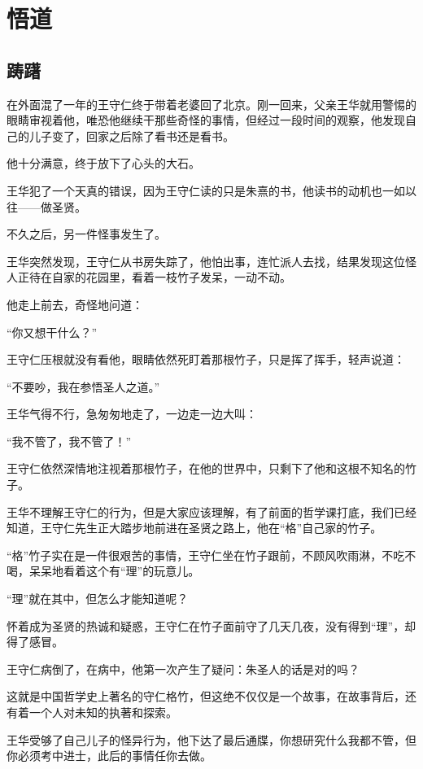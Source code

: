 \section{悟道}
\ifnum{}
	\begin{multicols}{\theparacolNo}
\fi
\subsection{踌躇}
在外面混了一年的王守仁终于带着老婆回了北京。刚一回来，父亲王华就用警惕的眼睛审视着他，唯恐他继续干那些奇怪的事情，但经过一段时间的观察，他发现自己的儿子变了，回家之后除了看书还是看书。

他十分满意，终于放下了心头的大石。

王华犯了一个天真的错误，因为王守仁读的只是朱熹的书，他读书的动机也一如以往——做圣贤。

不久之后，另一件怪事发生了。

王华突然发现，王守仁从书房失踪了，他怕出事，连忙派人去找，结果发现这位怪人正待在自家的花园里，看着一枝竹子发呆，一动不动。

他走上前去，奇怪地问道：

“你又想干什么？”

王守仁压根就没有看他，眼睛依然死盯着那根竹子，只是挥了挥手，轻声说道：

“不要吵，我在参悟圣人之道。”

王华气得不行，急匆匆地走了，一边走一边大叫：

“我不管了，我不管了！”

王守仁依然深情地注视着那根竹子，在他的世界中，只剩下了他和这根不知名的竹子。

王华不理解王守仁的行为，但是大家应该理解，有了前面的哲学课打底，我们已经知道，王守仁先生正大踏步地前进在圣贤之路上，他在“格”自己家的竹子。

“格”竹子实在是一件很艰苦的事情，王守仁坐在竹子跟前，不顾风吹雨淋，不吃不喝，呆呆地看着这个有“理”的玩意儿。

“理”就在其中，但怎么才能知道呢？

怀着成为圣贤的热诚和疑惑，王守仁在竹子面前守了几天几夜，没有得到“理”，却得了感冒。

王守仁病倒了，在病中，他第一次产生了疑问：朱圣人的话是对的吗？

这就是中国哲学史上著名的守仁格竹，但这绝不仅仅是一个故事，在故事背后，还有着一个人对未知的执著和探索。

王华受够了自己儿子的怪异行为，他下达了最后通牒，你想研究什么我都不管，但你必须考中进士，此后的事情任你去做。


\end{multicols}
